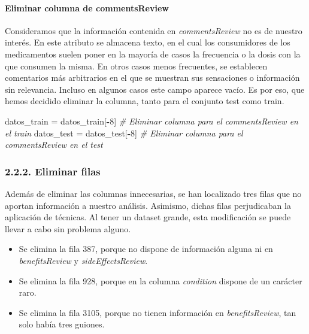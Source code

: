 \documentclass[spanish,]{article}
\newenvironment{Shaded}{\begin{snugshade}}{\end{snugshade}}
\newcommand{\DecValTok}[1]{\textcolor[rgb]{0.00,0.00,0.81}{#1}}
\newcommand{\StringTok}[1]{\textcolor[rgb]{0.31,0.60,0.02}{#1}}
\newcommand{\CommentTok}[1]{\textcolor[rgb]{0.56,0.35,0.01}{\textit{#1}}}
\newcommand{\OperatorTok}[1]{\textcolor[rgb]{0.81,0.36,0.00}{\textbf{#1}}}
\newcommand{\NormalTok}[1]{#1}
\providecommand{\tightlist}{%
  \setlength{\itemsep}{0pt}\setlength{\parskip}{0pt}}
\let\oldparagraph\paragraph
\renewcommand{\paragraph}[1]{\oldparagraph{#1}\mbox{}}
\begin{document}
\paragraph{Eliminar columna de
commentsReview}\label{eliminar-columna-de-commentsreview}

Consideramos que la información contenida en \emph{commentsReview} no es
de nuestro interés. En este atributo se almacena texto, en el cual los
consumidores de los medicamentos suelen poner en la mayoría de casos la
frecuencia o la dosis con la que consumen la misma. En otros casos menos
frecuentes, se establecen comentarios más arbitrarios en el que se
muestran sus sensaciones o información sin relevancia. Incluso en
algunos casos este campo aparece vacío. Es por eso, que hemos decidido
eliminar la columna, tanto para el conjunto test como train.

\begin{Shaded}
\begin{Highlighting}[]
\NormalTok{datos_train =}\StringTok{ }\NormalTok{datos_train[}\OperatorTok{-}\DecValTok{8}\NormalTok{] }\CommentTok{# Eliminar columna para el commentsReview en el train}
\NormalTok{datos_test =}\StringTok{ }\NormalTok{datos_test[}\OperatorTok{-}\DecValTok{8}\NormalTok{] }\CommentTok{# Eliminar columna para el commentsReview en el test}
\end{Highlighting}
\end{Shaded}

\subsubsection{2.2.2. Eliminar filas}\label{eliminar-filas}

Además de eliminar las columnas innecesarias, se han localizado tres
filas que no aportan información a nuestro análisis. Asimismo, dichas
filas perjudicaban la aplicación de técnicas. Al tener un dataset
grande, esta modificación se puede llevar a cabo sin problema alguno.

\begin{itemize}
\tightlist
\item
  Se elimina la fila 387, porque no dispone de información alguna ni en
  \emph{benefitsReview} y \emph{sideEffectsReview}.
\item
  Se elimina la fila 928, porque en la columna \emph{condition} dispone
  de un carácter raro.
\item
  Se elimina la fila 3105, porque no tienen información en
  \emph{benefitsReview}, tan solo había tres guiones.
\end{itemize}
\end{document}
